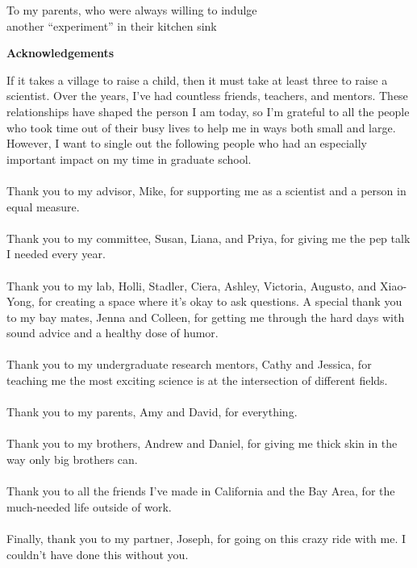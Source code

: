 \documentclass[11pt,letterpaper,oneside]{book}
\begin{document}
\setcounter{page}{1}  %

\null  %
\vfill
\begin{center}
    To my parents, who were always willing to indulge\\
    another ``experiment'' in their kitchen sink
\end{center}
\vfill
\clearpage

\begin{center}
    \bfseries\Large Acknowledgements
\end{center}
\bigskip
If it takes a village to raise a child, then it must take at least three to raise a scientist. Over the years, I've had countless friends, teachers, and mentors. These relationships have shaped the person I am today, so I'm grateful to all the people who took time out of their busy lives to help me in ways both small and large. However, I want to single out the following people who had an especially important impact on my time in graduate school.\\\\
Thank you to my advisor, Mike, for supporting me as a scientist and a person in equal measure.\\\\
Thank you to my committee, Susan, Liana, and Priya, for giving me the pep talk I needed every year.\\\\
Thank you to my lab, Holli, Stadler, Ciera, Ashley, Victoria, Augusto, and Xiao-Yong, for creating a space where it's okay to ask questions. A special thank you to my bay mates, Jenna and Colleen, for getting me through the hard days with sound advice and a healthy dose of humor.\\\\
Thank you to my undergraduate research mentors, Cathy and Jessica, for teaching me the most exciting science is at the intersection of different fields.\\\\
Thank you to my parents, Amy and David, for everything.\\\\
Thank you to my brothers, Andrew and Daniel, for giving me thick skin in the way only big brothers can.\\\\
Thank you to all the friends I've made in California and the Bay Area, for the much-needed life outside of work.\\\\
Finally, thank you to my partner, Joseph, for going on this crazy ride with me. I couldn't have done this without you.
\clearpage
\end{document}
